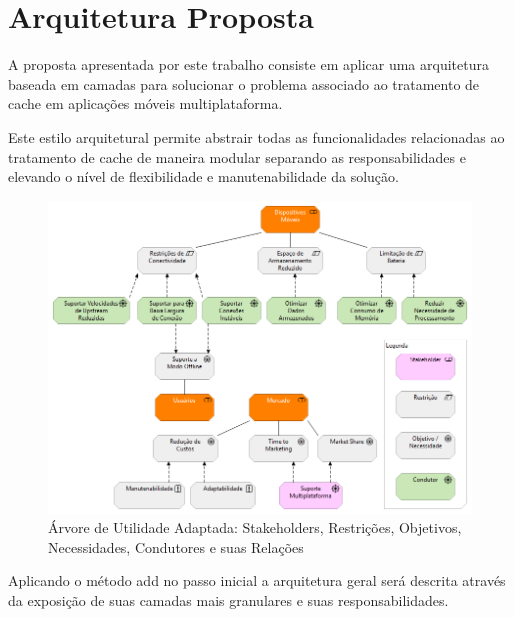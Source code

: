 \documentclass[
	article,			%
	11pt,				%
	oneside,			%
	a4paper,			%
	english,			%
	brazil,				%
	sumario=tradicional
]{abntex2}
\begin{document}
\section{Arquitetura Proposta}
A proposta apresentada por este trabalho consiste em aplicar uma arquitetura baseada em camadas para solucionar o problema associado ao tratamento de cache em aplicações móveis multiplataforma.

Este estilo arquitetural permite abstrair todas as funcionalidades relacionadas ao tratamento de cache de maneira modular separando as responsabilidades e elevando o nível de flexibilidade e manutenabilidade da solução.

\begin{figure}
	\centering
	\includegraphics[scale=0.5]{images/UtilityTree}
	\caption{Árvore de Utilidade Adaptada: Stakeholders, Restrições, Objetivos, Necessidades, Condutores e suas Relações}
\end{figure}


Aplicando o método \gls{add} no passo inicial a arquitetura geral será descrita através da exposição de suas camadas mais granulares e suas responsabilidades.
\end{document}
